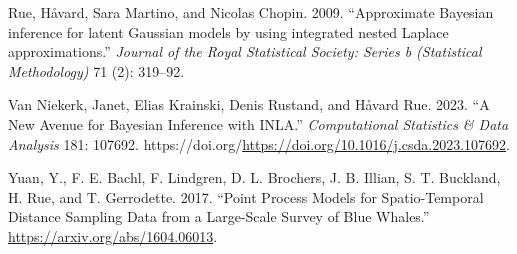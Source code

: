 \documentclass[
  a4paper,
]{article}
\newlength{\cslhangindent}
\newlength{\cslentryspacingunit} %
\newenvironment{CSLReferences}[2] %
 {%
  \setlength{\parindent}{0pt}
  \ifodd #1
  \let\oldpar\par
  \def\par{\hangindent=\cslhangindent\oldpar}
  \fi
  \setlength{\parskip}{#2\cslentryspacingunit}
 }%
 {}
\begin{document}
\begin{CSLReferences}{1}{0}
\leavevmode{}%
Rue, Håvard, Sara Martino, and Nicolas Chopin. 2009. {``{Approximate
Bayesian inference for latent Gaussian models by using integrated nested
Laplace approximations}.''} \emph{Journal of the Royal Statistical
Society: Series b (Statistical Methodology)} 71 (2): 319--92.

\leavevmode{}%
Van Niekerk, Janet, Elias Krainski, Denis Rustand, and Håvard Rue. 2023.
{``A New Avenue for Bayesian Inference with INLA.''} \emph{Computational
Statistics \& Data Analysis} 181: 107692.
https://doi.org/\url{https://doi.org/10.1016/j.csda.2023.107692}.

\leavevmode{}%
Yuan, Y., F. E. Bachl, F. Lindgren, D. L. Brochers, J. B. Illian, S. T.
Buckland, H. Rue, and T. Gerrodette. 2017. {``Point Process Models for
Spatio-Temporal Distance Sampling Data from a Large-Scale Survey of Blue
Whales.''} \url{https://arxiv.org/abs/1604.06013}.

\end{CSLReferences}
\end{document}

